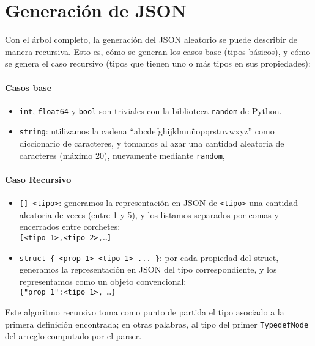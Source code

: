 \hypertarget{sec:json}{\section{Generación de JSON}}

    Con el árbol completo, la generación del JSON aleatorio se puede describir de manera recursiva. Esto es, cómo se generan los casos base (tipos básicos), y cómo se genera el caso recursivo (tipos que tienen uno o más tipos en sus propiedades):

\paragraph{Casos base}

\begin{itemize}
    \item \texttt{int}, \texttt{float64} y \texttt{bool} son triviales con la
        biblioteca \texttt{random} de Python.
    \item \texttt{string}: utilizamos la cadena ``abcdefghijklmnñopqrstuvwxyz''
        como diccionario de caracteres, y tomamos al azar una cantidad aleatoria de
        caracteres (máximo 20), nuevamente mediante \texttt{random},
\end{itemize}

\paragraph{Caso Recursivo}

\begin{itemize}
    \item \texttt{[] <tipo>}: generamos la representación en JSON de \texttt{<tipo>} una
        cantidad aleatoria de veces (entre 1 y 5), y los listamos separados por comas y
        encerrados entre corchetes:\\
        \texttt{[<tipo 1>,<tipo 2>,\dots]}
    \item \texttt{struct \{ <prop 1>~<tipo 1>~... \}}: por cada propiedad del
        struct, generamos la representación en JSON del tipo correspondiente, y
        los representamos como un objeto convencional: \\
        \texttt{\{"prop 1":<tipo 1>, \dots\}}
\end{itemize}

    Este algoritmo recursivo toma como punto de partida el tipo asociado a la primera definición encontrada; en otras palabras, al tipo del primer \texttt{TypedefNode} del arreglo computado por el parser.


